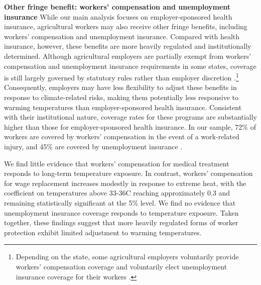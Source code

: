 \documentclass[12pt]{article}
\begin{document}
\clearpage
\vspace{0.5cm}
\noindent \textbf{Other fringe benefit: workers' compensation and unemployment insurance} 
While our main analysis focuses on employer-sponsored health insurance, agricultural workers may also receive other fringe benefits, including workers’ compensation and unemployment insurance. Compared with health insurance, however, these benefits are more heavily regulated and institutionally determined. Although agricultural employers are partially exempt from workers’ compensation and unemployment insurance requirements in some states, coverage is still largely governed by statutory rules rather than employer discretion \citep{jbs_international_findings_2023}.\footnote{Depending on the state, some agricultural employers voluntarily provide workers’ compensation coverage \citep{mceowen_workers_2015} and voluntarily elect unemployment insurance coverage for their workers \citep{cook_marylands_2025}.} Consequently, employers may have less flexibility to adjust these benefits in response to climate-related risks, making them potentially less responsive to warming temperatures than employer-sponsored health insurance. Consistent with their institutional nature, coverage rates for these programs are substantially higher than those for employer-sponsored health insurance. In our sample, 72\% of workers are covered by workers’ compensation in the event of a work-related injury, and 45\% are covered by unemployment insurance \citep{jbs_international_findings_2023}.


We find little evidence that workers’ compensation for medical treatment responds to long-term temperature exposure. In contrast, workers’ compensation for wage replacement increases modestly in response to extreme heat, with the coefficient on temperatures above 33-36\degree C reaching approximately 0.3 and remaining statistically significant at the 5\% level. We find no evidence that unemployment insurance coverage responds to temperature exposure. Taken together, these findings suggest that more heavily regulated forms of worker protection exhibit limited adjustment to warming temperatures.




\clearpage
\end{document}
